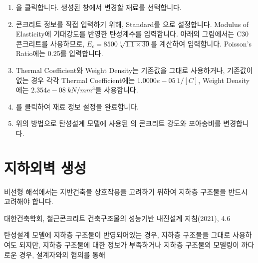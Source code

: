 \documentclass[a4paper,11pt,korean,openany,oneside]{sphinxmanual}
\begin{document}
\begin{sphinxShadowBox}
\begin{enumerate}
%
\item {} 
\sphinxAtStartPar
{} \sphinxhyphen{} 을 클릭합니다. 생성된 창에서 변경할 재료를 선택합니다.

\item {} 
\sphinxAtStartPar
콘크리트 정보를 직접 입력하기 위해, Standard를 으로 설정합니다.
Modulus of Elasticity에 기대강도를 반영한 탄성계수를 입력합니다.
아래의 그림에서는 C30 콘크리트를 사용하므로, \(E_c = 8500 \sqrt[3]{1.1 \times 30}\)를 계산하여 입력합니다.
Poisson’s Ratio에는 0.25를 입력합니다.

\begin{center}
\noindent{}
\end{center}

\item {} 
\sphinxAtStartPar
Thermal Coefficient와 Weight Density는 기존값을 그대로 사용하거나,
기존값이 없는 경우 각각 Thermal Coefficient에는 \(1.0000e-05 \ 1/[C]\),
Weight Density에는 \(2.354e-08 \ kN/mm^3\)을 사용합니다.

\item {} 
\sphinxAtStartPar
{}를 클릭하여 재료 정보 설정을 완료합니다.

\item {} 
\sphinxAtStartPar
위의 방법으로 탄성설계 모델에 사용된 의 콘크리트 강도와 포아송비를 변경합니다.

\end{enumerate}
\end{sphinxShadowBox}

\sphinxstepscope


\section{지하외벽 생성}
\label{\detokenize{1_base_wall:id1}}\label{\detokenize{1_base_wall::doc}}
\sphinxAtStartPar
비선형 해석에서는 지반\sphinxhyphen{}건축물 상호작용을 고려하기 위하여 지하층 구조물을 반드시 고려해야 합니다. %
\begin{footnote}[1]\sphinxAtStartFootnote
대한건축학회, 철근콘크리트 건축구조물의 성능기반 내진설계 지침(2021), 4.6
%
\end{footnote}
탄성설계 모델에 지하층 구조물이 반영되어있는 경우, 지하층 구조물을 그대로 사용하여도 되지만,
지하층 구조물에 대한 정보가 부족하거나 지하층 구조물의 모델링이 까다로운 경우,
설계자와의 협의를 통해 
\end{document}
